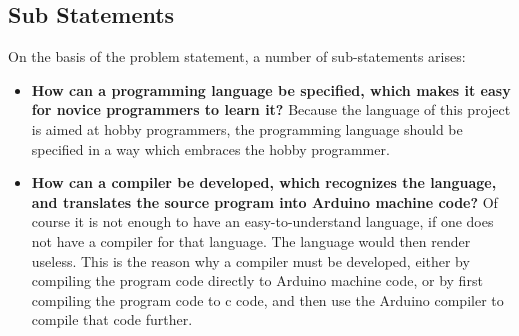 \subsection{Sub Statements}
On the basis of the problem statement, a number of sub-statements arises:
\begin{itemize}
	\item \textbf{How can a programming language be specified, which makes it easy for novice programmers to learn it?} Because the language of this project is aimed at hobby programmers, the programming language should be specified in a way which embraces the hobby programmer.
	\item \textbf{How can a compiler be developed, which recognizes the language, and translates the source program into Arduino machine code?} Of course it is not enough to have an easy-to-understand language, if one does not have a compiler for that language. The language would then render useless. This is the reason why a compiler must be developed, either by compiling the program code directly to Arduino machine code, or by first compiling the program code to c code, and then use the Arduino compiler to compile that code further. 
\end{itemize}